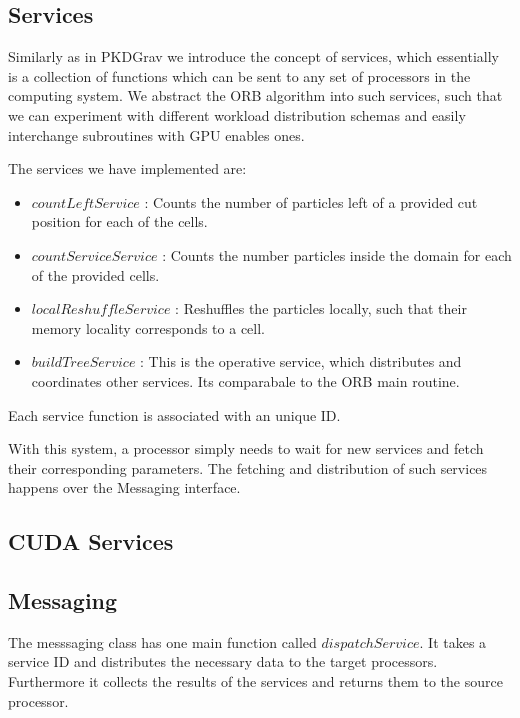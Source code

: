 \documentclass[]{article}
\begin{document}
\subsection{Services}

Similarly as in PKDGrav we introduce the concept of services, which essentially is a collection of functions which can be sent to any set of processors in the computing system. We abstract the ORB algorithm into such services, such that we can experiment with different workload distribution schemas and easily interchange subroutines with GPU enables ones.

The services we have implemented are:

\begin{itemize}
	\item $countLeftService$ : Counts the number of particles left of a provided cut position for each of the cells.
	\item $countServiceService$ : Counts the number particles inside the domain for each of the provided cells.
	\item $localReshuffleService$ : Reshuffles the particles locally, such that their memory locality corresponds to a cell. 
	\item $buildTreeService$ : This is the operative service, which distributes and coordinates other services. Its comparabale to the ORB main routine. 
\end{itemize}

Each service function is associated with an unique ID.

With this system, a processor simply needs to wait for new services and fetch their corresponding parameters. The fetching and distribution of such services happens over the Messaging interface.

\subsection{CUDA Services}



\subsection{Messaging}

The messsaging class has one main function called $dispatchService$. It takes a service ID and distributes the necessary data to the target processors. Furthermore it collects the results of the services and returns them to the source processor.
\end{document}
